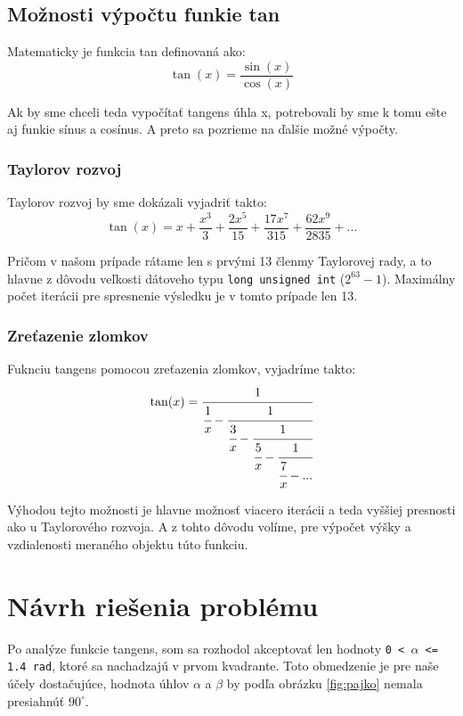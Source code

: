 \documentclass[12pt,a4paper,titlepage,final]{report}
\begin{document}
\section{Možnosti výpočtu funkie tan}
Matematicky je funkcia tan definovaná ako:
\begin{equation} \label{eq:taylor}
\tan(x) = \frac{\sin(x)}{\cos(x)}
\end{equation}

Ak by sme chceli teda vypočítať tangens úhla x, potrebovali by sme k tomu ešte aj funkie sínus a cosínus. A preto sa pozrieme na ďalšie možné výpočty.

\subsection{Taylorov rozvoj}
Taylorov rozvoj by sme dokázali vyjadriť takto:
\begin{equation} \label{eq:taylor}
\tan(x) = x + \frac{x^3}{3} + \frac{2x^5}{15} + \frac{17x^7}{315} + \frac{62x^9}{2835} + ...
\end{equation}

Pričom v našom prípade rátame len s prvými 13 členmy Taylorovej rady, a to hlavne z dôvodu veľkosti dátoveho typu \texttt{long unsigned int} ($2^{63}-1$). Maximálny počet iterácii pre spresnenie výsledku je v tomto prípade len 13.

\subsection{Zreťazenie zlomkov} \label{subsec:zlomky}
Fuknciu tangens pomocou zreťazenia zlomkov, vyjadríme takto:
\begin{equation} \label{eq:cfrac}
\tan(x) = \cfrac{1}{ \cfrac{1}{x} - \cfrac{1}{\cfrac{3}{x} - \cfrac{1}{\cfrac{5}{x} - \cfrac{1}{\cfrac{7}{x} - ... }} }}
\end{equation}

Výhodou tejto možnosti je hlavne možnosť viacero iterácii a teda vyššiej presnosti ako u Taylorového rozvoja. A z tohto dôvodu volíme, pre výpočet výšky a vzdialenosti meraného objektu túto funkciu.

\chapter{Návrh riešenia problému}
Po analýze funkcie tangens, som sa rozhodol akceptovať len hodnoty \texttt{0 < $\alpha$ <= 1.4 rad}, ktoré sa nachadzajú v prvom kvadrante. Toto obmedzenie je pre naše účely dostačujúce, hodnota úhlov $\alpha$ a $\beta$ by podľa obrázku \ref{fig:pajko} nemala presiahnúť $90^\circ$.
\end{document}
